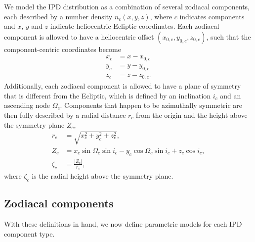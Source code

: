 \documentclass[twocolumn]{aa}
\begin{document}
We model the IPD distribution as a combination of several zodiacal
components, each described by a number density $n_c(x,y,z)$, where $c$
indicates components and $x$, $y$ and $z$ indicate heliocentric
Ecliptic coordinates. Each zodiacal component is allowed to have a
heliocentric offset $(x_{0,c}, y_{0,c}, z_{0,c})$, such that the
component-centric coordinates become
\begin{equation}    
    \begin{aligned}
        x_c&= x - x_{0,c}\\
        y_c&= y - y_{0,c}\\
        z_c&= z - z_{0,c}.
    \end{aligned}
\end{equation}
Additionally, each zodiacal component is allowed to have a plane of
symmetry that is different from the Ecliptic, which is defined by an
inclination $i_c$ and an ascending node $\Omega_c$. Components that
happen to be azimuthally symmetric are then fully described by a
radial distance $r_c$ from the origin and the height above the
symmetry plane $Z_c$,
\begin{align}
    r_c &= \sqrt{x_c^2 + y_c^2 + z_c^2},\\
    Z_c &= x_c\sin{\Omega_c}\sin{i_c} - y_c \cos{\Omega_c}\sin{i_c} + z_c \cos{i_c},\\
    \zeta_c &= \frac{|Z_\mathrm{c}|}{r_\mathrm{c}},
\end{align}
where $\zeta_c$ is the radial height above the symmetry plane.

\subsection{Zodiacal components}

With these definitions in hand, we now define parametric models for
each IPD component type.
\end{document}
